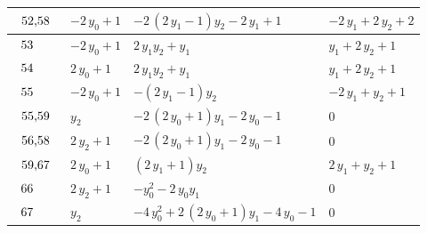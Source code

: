 \begin{table}[H]
\begin{center}
{\begin{tabular}{|l|l|l|l|}
$\begin{tabular}{l}
52,58 \\
\end{tabular}$ & $ -2 \, y_{0} + 1 $ & $ -2 \, {\left(2 \, y_{1} - 1\right)} y_{2} - 2 \, y_{1} + 1 $ & $ -2 \, y_{1} + 2 \, y_{2} + 2 $ \\ \hline
$\begin{tabular}{l}
53 \\
\end{tabular}$ & $ -2 \, y_{0} + 1 $ & $ 2 \, y_{1} y_{2} + y_{1} $ & $ y_{1} + 2 \, y_{2} + 1 $ \\ \hline
$\begin{tabular}{l}
54 \\
\end{tabular}$ & $ 2 \, y_{0} + 1 $ & $ 2 \, y_{1} y_{2} + y_{1} $ & $ y_{1} + 2 \, y_{2} + 1 $ \\ \hline
$\begin{tabular}{l}
55 \\
\end{tabular}$ & $ -2 \, y_{0} + 1 $ & $ -{\left(2 \, y_{1} - 1\right)} y_{2} $ & $ -2 \, y_{1} + y_{2} + 1 $ \\ \hline
$\begin{tabular}{l}
55,59 \\
\end{tabular}$ & $ y_{2} $ & $ -2 \, {\left(2 \, y_{0} + 1\right)} y_{1} - 2 \, y_{0} - 1 $ & $ 0 $ \\ \hline
$\begin{tabular}{l}
56,58 \\
\end{tabular}$ & $ 2 \, y_{2} + 1 $ & $ -2 \, {\left(2 \, y_{0} + 1\right)} y_{1} - 2 \, y_{0} - 1 $ & $ 0 $ \\ \hline
$\begin{tabular}{l}
59,67 \\
\end{tabular}$ & $ 2 \, y_{0} + 1 $ & $ {\left(2 \, y_{1} + 1\right)} y_{2} $ & $ 2 \, y_{1} + y_{2} + 1 $ \\ \hline
$\begin{tabular}{l}
66 \\
\end{tabular}$ & $ 2 \, y_{2} + 1 $ & $ -y_{0}^{2} - 2 \, y_{0} y_{1} $ & $ 0 $ \\ \hline
$\begin{tabular}{l}
67 \\
\end{tabular}$ & $ y_{2} $ & $ -4 \, y_{0}^{2} + 2 \, {\left(2 \, y_{0} + 1\right)} y_{1} - 4 \, y_{0} - 1 $ & $ 0 $ \\ \hline

\end{tabular}}
\end{center}
\end{table}
